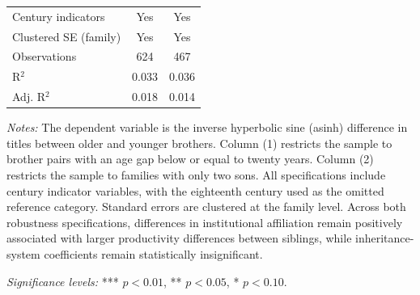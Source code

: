 \begin{table}[H]
\begin{tablebody}
\begin{tabular}{l c c}
\midrule
Century indicators & Yes & Yes \\
Clustered SE (family) & Yes & Yes \\
\midrule

Observations & 624 & 467 \\
R$^{2}$ & 0.033 & 0.036 \\
Adj. R$^{2}$ & 0.018 & 0.014 \\

\bottomrule
\end{tabular}
\end{tablebody}

\vspace{4pt}
\begin{minipage}{\textwidth}
\footnotesize
\textit{Notes:} The dependent variable is the inverse hyperbolic sine (asinh) difference in titles between older and younger brothers. Column (1) restricts the sample to brother pairs with an age gap below or equal to twenty years. Column (2) restricts the sample to families with only two sons. All specifications include century indicator variables, with the eighteenth century used as the omitted reference category. Standard errors are clustered at the family level. Across both robustness specifications, differences in institutional affiliation remain positively associated with larger productivity differences between siblings, while inheritance-system coefficients remain statistically insignificant.

\textit{Significance levels:} *** $p<0.01$, ** $p<0.05$, * $p<0.10$.
\end{minipage}

\end{table}